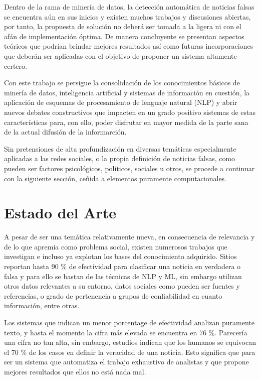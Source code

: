 \documentclass{llncs}
\begin{document}
\begin{multicols}{2}[]
Dentro de la rama de miner\'ia de datos, la detecci\'on autom\'atica de noticias falsas se encuentra a\'un en sus inicios y existen muchos trabajos y discusiones abiertas,
por tanto, la propuesta de soluci\'on no deber\'a ser tomada a la ligera ni con el af\'an de implementaci\'on \'optima. De manera concluyente se presentan aspectos te\'oricos
que podr\'ian brindar mejores resultados as\'i como futuras incorporaciones que deber\'an ser aplicadas con el objetivo de proponer un sistema altamente certero.

Con este trabajo se persigue la consolidaci\'on de los conocimientos b\'asicos de miner\'ia de datos, inteligencia artificial y sistemas de informaci\'on en cuesti\'on, la aplicaci\'on 
de esquemas de procesamiento de lenguaje natural (NLP) y abrir nuevos debates constructivos que impacten en un grado positivo sistemas de estas caracter\'isticas para, 
con ello, poder disfrutar en mayor medida de la parte sana de la actual difusi\'on de la informarci\'on.

Sin pretensiones de alta profundizaci\'on en diversas tem\'aticas especialmente aplicadas a las redes sociales, o la propia definici\'on de noticias falsas, como pueden ser factores
 psicol\'ogicos, pol\'iticos, sociales u otros, se procede a continuar con la siguiente secci\'on, ce\~nida a elementos puramente computacionales.

\section{Estado del Arte}

A pesar de ser una tem\'atica relativamente nueva, en consecuencia de relevancia y de lo que apremia como problema social, existen numerosos trabajos que investigan e incluso
ya explotan los bases del conocimiento adquirido. Sitios reportan hasta 90 \% de efectividad para clasificar una noticia en verdadera o falsa y para ello se bastan de las t\'ecnicas
de NLP y ML, sin embargo utilizan otros datos relevantes a su entorno, datos sociales como pueden ser fuentes y referencias, o grado de pertenencia a grupos de confiabilidad en
cuanto informaci\'on, entre otras.

Los sistemas que indican un menor porcentage de efectividad analizan puramente texto, y hasta el momento la cifra m\'as elevada se encuentra en 76 \%. Parecer\'ia una cifra
no tan alta, sin embargo, estudios indican que los humanos se equivocan el 70 \% de los casos en definir la veracidad de una noticia. Esto significa que para ser un sistema que
automatiza el trabajo exhaustivo de analistas y que propone mejores resultados que ellos no est\'a nada mal.


\end{multicols}
\end{document}
